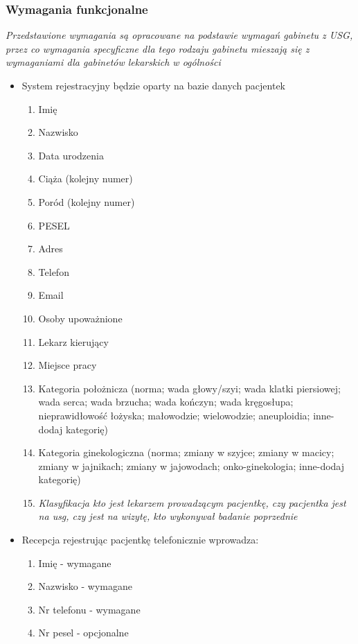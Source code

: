 \documentclass[polish,12pt]{aghthesis}
\begin{document}
\subsubsection{Wymagania funkcjonalne}
\small\emph{Przedstawione wymagania są opracowane na podstawie wymagań gabinetu z USG, przez co wymagania specyficzne dla tego rodzaju gabinetu mieszają się z  wymaganiami dla gabinetów lekarskich w ogólności}
\begin{itemize}
    \item System rejestracyjny będzie oparty na bazie danych pacjentek \begin{enumerate}
      \item Imię
      \item Nazwisko
      \item Data urodzenia
      \item Ciąża (kolejny numer)
      \item Poród (kolejny numer)
      \item PESEL
      \item Adres
      \item Telefon
      \item Email
      \item Osoby upoważnione
      \item Lekarz kierujący
      \item Miejsce pracy
      \item Kategoria położnicza (norma; wada głowy/szyi; wada klatki piersiowej; wada serca; wada brzucha; wada kończyn; wada kręgosłupa; nieprawidłowość łożyska; małowodzie; wielowodzie; aneuploidia; inne-dodaj kategorię)
      \item Kategoria ginekologiczna (norma; zmiany w szyjce; zmiany w macicy; zmiany w jajnikach; zmiany w jajowodach; onko-ginekologia; inne-dodaj kategorię)
      \item \emph{Klasyfikacja kto jest lekarzem prowadzącym pacjentkę, czy pacjentka jest na usg, czy jest na wizytę, kto wykonywał badanie poprzednie}
    \end{enumerate}
    \item Recepcja rejestrując pacjentkę telefonicznie wprowadza: \begin{enumerate}
      \item Imię - wymagane
      \item Nazwisko - wymagane
      \item Nr telefonu - wymagane
      \item Nr pesel - opcjonalne

\end{enumerate}
\end{itemize}
\end{document}
